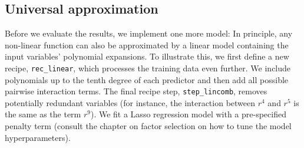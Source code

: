 \documentclass[
]{krantz}
\newenvironment{Shaded}{\begin{snugshade}}{\end{snugshade}}
\newcommand{\AttributeTok}[1]{\textcolor[rgb]{0.61,0.61,0.61}{#1}}
\newcommand{\ConstantTok}[1]{\textcolor[rgb]{0,0,0}{#1}}
\newcommand{\DecValTok}[1]{\textcolor[rgb]{0.06,0.06,0.06}{#1}}
\newcommand{\ErrorTok}[1]{\textcolor[rgb]{0.14,0.14,0.14}{\textbf{#1}}}
\newcommand{\FunctionTok}[1]{\textcolor[rgb]{0,0,0}{#1}}
\newcommand{\NormalTok}[1]{#1}
\newcommand{\SpecialCharTok}[1]{\textcolor[rgb]{0,0,0}{#1}}
\begin{document}
\begin{Shaded}
\end{Shaded}

\hypertarget{universal-approximation}{%
\subsection{Universal approximation}\label{universal-approximation}}

Before we evaluate the results, we implement one more model: In principle, any non-linear function can also be approximated by a linear model containing the input variables' polynomial expansions. To illustrate this, we first define a new recipe, \texttt{rec\_linear}, which processes the training data even further. We include polynomials up to the tenth degree of each predictor and then add all possible pairwise interaction terms. The final recipe step, \texttt{step\_lincomb}, removes potentially redundant variables (for instance, the interaction between \(r^4\) and \(r^5\) is the same as the term \(r^9\)). We fit a Lasso regression model with a pre-specified penalty term (consult the chapter on factor selection on how to tune the model hyperparameters).
\end{document}
